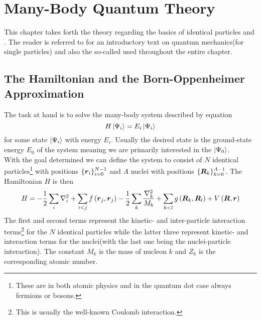 \chapter{Many-Body Quantum Theory\label{chapter:3}}     
    This chapter takes forth the theory regarding the basics of identical
    particles and . The reader is referred
    to \cite{GriffQuan} for an introductory text on quantum mechanics(for
    single particles) and also the so-called  used
    throughout the entire chapter.

\section{The Hamiltonian and the Born-Oppenheimer Approximation\label{sec:3.1}}
    The task at hand is to solve the many-body system described by
     equation
        \begin{equation}
            H\ket{\Psi_i} = E_i\ket{\Psi_i}
            \label{eq:SE}
        \end{equation}
    for some state $\ket{\Psi_i}$ with energy $E_i$. Usually the desired state
    is the ground-state energy $E_0$ of the system meaning we are primarily
    interested in the  $\ket{\Psi_0}$. \\ With the goal
    determined we can define the system to consist of $N$ identical
    particles\footnote{These are in both atomic physics and in the quantum dot
    case always fermions or bosons.} with positions
    $\{\boldsymbol{{r}}_i\}^{N-1}_{i=0}$ and $A$ nuclei with positions
    $\{\boldsymbol{{R}}_k\}^{A-1}_{k=0}$. The Hamiltonian $H$ is then
        \begin{equation}
            H = - \frac{1}{2} \sum\limits_i \nabla^2_i + \sum_{i<j}
            f\left(\boldsymbol{{r}}_j, \boldsymbol{{r}}_j\right) - \frac{1}{2} \sum_k
            \frac{\nabla^2_k}{M_k} + \sum_{k<l}
            g\left(\boldsymbol{{R}}_k,\boldsymbol{{R}}_l\right) +
            V\left(\boldsymbol{{R}},\boldsymbol{{r}}\right)
        \end{equation}
    The first and second terms represent the kinetic- and inter-particle
    interaction terms\footnote{This is usually the well-known Coulomb
    interaction.} for the $N$ identical particles while the latter three
    represent kinetic- and interaction terms for the nuclei(with the last one
    being the nuclei-particle interaction). The constant $M_k$ is the mass of
    nucleon $k$ and $Z_k$ is the corresponding atomic number.

